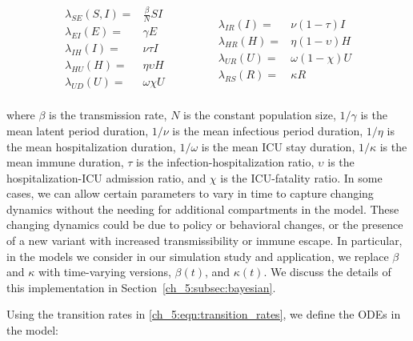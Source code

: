 \begin{equation}
\begin{aligned}
\lambda_{SE}(S, I)  =&  \frac{\beta}{N} S I   \\
\lambda_{EI}(E)  =& \gamma E    \\
\lambda_{IH}(I)  =& \nu \tau I   \\
\lambda_{HU}(H)  =& \eta  \upsilon H   \\
\lambda_{UD}(U)  =& \omega \chi U \\
\end{aligned}
\qquad \quad \quad
\begin{aligned}
\lambda_{IR}(I)  =& \nu \left(1 - \tau \right) I   \\
\lambda_{HR}(H)  =& \eta \left(1 - \upsilon \right) H \\
\lambda_{UR}(U)  =& \omega \left( 1 - \chi \right) U    \\
\lambda_{RS}(R)  =& \kappa R
\end{aligned}
\label{ch_5:eqn:transition_rates}
\end{equation}

where \( \beta \) is the transmission rate, \( N \) is the constant population size, \( 1 / \gamma  \) is the mean latent period duration, \( 1 / \nu \) is the mean infectious period duration, \( 1 / \eta \) is the mean hospitalization duration, \( 1 / \omega \) is the mean ICU stay duration, \( 1 / \kappa \) is the mean immune duration, \( \tau \) is the infection-hospitalization ratio, \( \upsilon \) is the hospitalization-ICU admission ratio, and \( \chi \) is the ICU-fatality ratio.
In some cases, we can allow certain parameters to vary in time to capture changing dynamics without the needing for additional compartments in the model.
These changing dynamics could be due to policy or behavioral changes, or the presence of a new variant with increased transmissibility or immune escape.
In particular, in the models we consider in our simulation study and application, we replace \( \beta \) and \( \kappa \) with time-varying versions, \( \beta(t) \), and \( \kappa(t) \).
We discuss the details of this implementation in Section~\ref{ch_5:subsec:bayesian}.

Using the transition rates in \eqref{ch_5:eqn:transition_rates}, we define the ODEs in the model:

